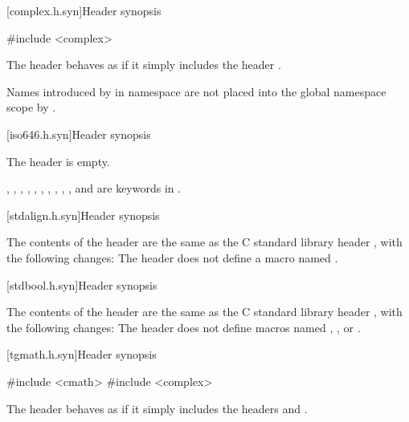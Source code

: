 [complex.h.syn]{Header  synopsis}

%
\begin{codeblock}
#include <complex>
\end{codeblock}

\pnum
The header 
behaves as if it simply includes the header
.

\pnum
\begin{note}
Names introduced by  in namespace 
are not placed into the global namespace scope by .
\end{note}

[iso646.h.syn]{Header  synopsis}

%
\pnum
The \Cpp{} header  is empty.
\begin{note}
,
,
,
,
,
,
,
,
,
, and
are keywords in \Cpp{}.
\end{note}

[stdalign.h.syn]{Header  synopsis}

%
\pnum
The contents of the \Cpp{} header  are the same as the C
standard library header , with the following changes:
The header  does not
define a macro named .


[stdbool.h.syn]{Header  synopsis}

%
\pnum
The contents of the \Cpp{} header  are the same as the C
standard library header , with the following changes:
The header  does not
define macros named , , or .


[tgmath.h.syn]{Header  synopsis}

%
\begin{codeblock}
#include <cmath>
#include <complex>
\end{codeblock}

\pnum
The header 
behaves as if it simply includes the headers
 and
.

